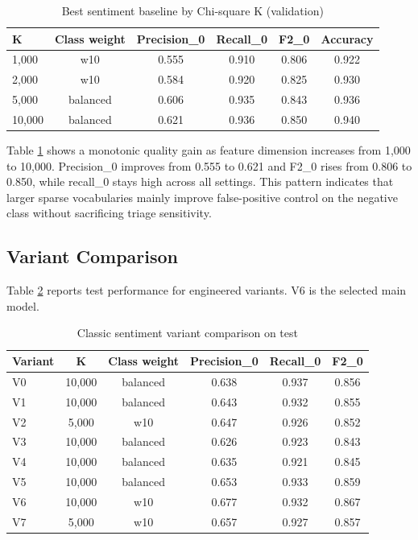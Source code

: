 \documentclass[12pt,a4paper]{article}
\begin{document}
\begin{table}[H]
\centering
\caption{Best sentiment baseline by Chi-square K (validation)}
\label{tab:chi2_k}
\begin{tabular}{lccccc}
\toprule
K & Class weight & Precision\_0 & Recall\_0 & F2\_0 & Accuracy \\
\midrule
1,000 & w10 & 0.555 & 0.910 & 0.806 & 0.922 \\
2,000 & w10 & 0.584 & 0.920 & 0.825 & 0.930 \\
5,000 & balanced & 0.606 & 0.935 & 0.843 & 0.936 \\
10,000 & balanced & 0.621 & 0.936 & 0.850 & 0.940 \\
\bottomrule
\end{tabular}
\end{table}

Table \ref{tab:chi2_k} shows a monotonic quality gain as feature dimension increases from 1,000 to 10,000. Precision\_0 improves from 0.555 to 0.621 and F2\_0 rises from 0.806 to 0.850, while recall\_0 stays high across all settings. This pattern indicates that larger sparse vocabularies mainly improve false-positive control on the negative class without sacrificing triage sensitivity.

\subsection{Variant Comparison}
Table \ref{tab:classic_variants} reports test performance for engineered variants. V6 is the selected main model.

\begin{table}[H]
\centering
\caption{Classic sentiment variant comparison on test}
\label{tab:classic_variants}
\begin{tabular}{lccccc}
\toprule
Variant & K & Class weight & Precision\_0 & Recall\_0 & F2\_0 \\
\midrule
V0 & 10,000 & balanced & 0.638 & 0.937 & 0.856 \\
V1 & 10,000 & balanced & 0.643 & 0.932 & 0.855 \\
V2 & 5,000 & w10 & 0.647 & 0.926 & 0.852 \\
V3 & 10,000 & balanced & 0.626 & 0.923 & 0.843 \\
V4 & 10,000 & balanced & 0.635 & 0.921 & 0.845 \\
V5 & 10,000 & balanced & 0.653 & 0.933 & 0.859 \\
V6 & 10,000 & w10 & 0.677 & 0.932 & 0.867 \\
V7 & 5,000 & w10 & 0.657 & 0.927 & 0.857 \\
\bottomrule
\end{tabular}
\end{table}
\end{document}

